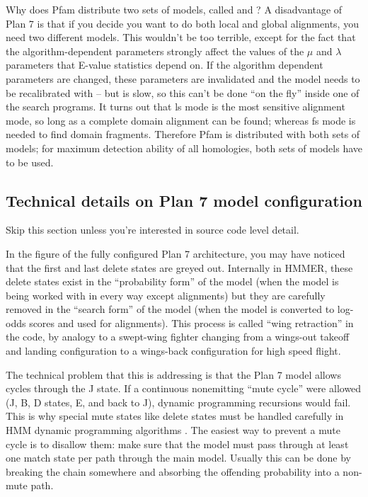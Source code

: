 \begin{srefaq}{Why does Pfam distribute two sets of models, called
 and ?}  A disadvantage of Plan 7 is that
if you decide you want to do both local and global alignments, you
need two different models.  This wouldn't be too terrible, except for
the fact that the algorithm-dependent parameters strongly affect the
values of the $\mu$ and $\lambda$ parameters that E-value statistics
depend on. If the algorithm dependent parameters are changed, these
parameters are invalidated and the model needs to be recalibrated with
 -- but  is slow, so this can't
be done ``on the fly'' inside one of the search programs. It turns out
that ls mode is the most sensitive alignment mode, so long as a
complete domain alignment can be found; whereas fs mode is needed to
find domain fragments. Therefore Pfam is distributed with both sets of
models; for maximum detection ability of all homologies, both sets of
models have to be used.
\end{srefaq}

\subsection{Technical details on Plan 7 model configuration}

Skip this section unless you're interested in source code level detail.

In the figure of the fully configured Plan 7 architecture, you may
have noticed that the first and last delete states are greyed
out. Internally in HMMER, these delete states exist in the
``probability form'' of the model (when the model is being worked with
in every way except alignments) but they are carefully removed in the
``search form'' of the model (when the model is converted to log-odds
scores and used for alignments). This process is called ``wing
retraction'' in the code, by analogy to a swept-wing fighter changing
from a wings-out takeoff and landing configuration to a wings-back
configuration for high speed flight.

The technical problem that this is addressing is that the Plan 7 model
allows cycles through the J state. If a continuous nonemitting ``mute
cycle'' were allowed (J, B, D states, E, and back to J), dynamic
programming recursions would fail. This is why special mute states
like delete states must be handled carefully in HMM dynamic
programming algorithms \citep{Durbin98}. The easiest way to prevent a
mute cycle is to disallow them: make sure that the model must pass
through at least one match state per path through the main model.
Usually this can be done by breaking the chain somewhere and absorbing
the offending probability into a non-mute path.

